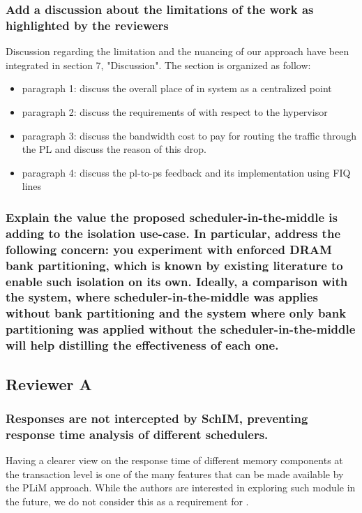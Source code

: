         \subsubsection{Add a discussion about the limitations of the work as highlighted by the reviewers}
            Discussion regarding the limitation and the nuancing of our approach have been integrated in section 7, "Discussion".
            The section is organized as follow:
            \begin{itemize}
                \item paragraph 1: discuss the overall place of \schim in system as a centralized point
                \item paragraph 2: discuss the requirements of \schim with respect to the hypervisor
                \item paragraph 3: discuss the bandwidth cost to pay for routing the traffic through the PL and discuss the reason of this drop.
                \item paragraph 4: discuss the pl-to-ps feedback and its implementation using FIQ lines
            \end{itemize}

        \subsubsection{Explain the value the proposed scheduler-in-the-middle is adding to the isolation use-case. In particular, address the following concern: you experiment with enforced DRAM bank partitioning, which is known by existing literature to enable such isolation on its own. Ideally, a comparison with the system, where scheduler-in-the-middle was applies without bank partitioning and the system where only bank partitioning was applied without the scheduler-in-the-middle will help distilling the effectiveness of each one.}


    \subsection{Reviewer A}
        \subsubsection{Responses are not intercepted by SchIM, preventing response time analysis of different schedulers.}
            Having a clearer view on the response time of different memory components at the transaction level is one of the many features that can be made available by the PLiM approach. While the authors are interested in exploring such module in the future, we do not consider this as a requirement for \schim.

